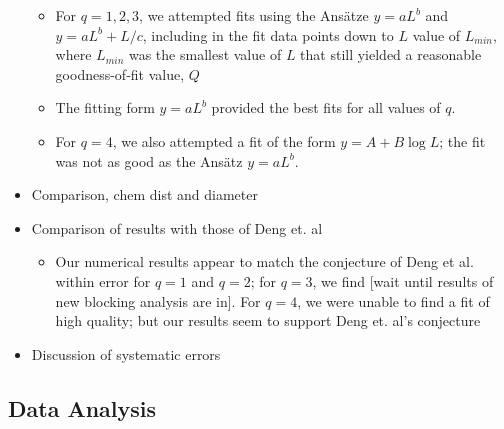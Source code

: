 \documentclass[11pt]{article}
\begin{document}
\begin{itemize}
\begin{itemize}

\item For $q=1,2,3$, we attempted fits using the Ans\"{a}tze $y=aL^b$ and $y=aL^b+L/c$, including in the fit data points down to $L$ value of $L_{min}$, where $L_{min}$ was the smallest value of $L$ that still yielded a reasonable goodness-of-fit value, $Q$\\
\label{sec-4.3.2.1}


\item The fitting form $y=aL^b$ provided the best fits for all values of $q$.\\
\label{sec-4.3.2.2}


\item For $q=4$, we also attempted a fit of the form $y=A+B \log L$; the fit was not as good as the Ans\"{a}tz $y=aL^b$.\\
\label{sec-4.3.2.3}

\end{itemize} %

\item Comparison, chem dist and diameter\\
\label{sec-4.4.1}


\item Comparison of results with those of Deng et. al\\
\label{sec-4.4.2}

\begin{itemize}

\item Our numerical results appear to match the conjecture of Deng et al. \cite{Deng2010} within error for $q=1$ and $q=2$; for $q=3$, we find [wait until results of new blocking analysis are in].  For $q=4$, we were unable to find a fit of high quality; but our results seem to support Deng et. al's conjecture\\
\label{sec-4.4.2.1}

\end{itemize} %

\item Discussion of systematic errors\\
\label{sec-4.4.3}

\end{itemize} %
\subsection{Data Analysis}
\label{sec-4.3}
\end{document}
